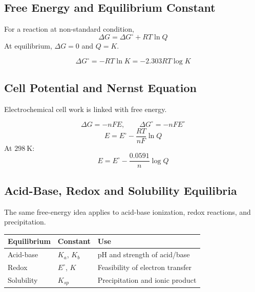 \documentclass[12pt,a4paper]{article}
\begin{document}
\subsection{Free Energy and Equilibrium Constant}
For a reaction at non-standard condition,
\[
\Delta G=\Delta G^\circ+RT\ln Q
\]
At equilibrium, $\Delta G=0$ and $Q=K$.

\begin{tcolorbox}[formulabox, title={Relation Between Free Energy and Equilibrium Constant}]
\[
\Delta G^\circ=-RT\ln K=-2.303RT\log K
\]
\end{tcolorbox}

\subsection{Cell Potential and Nernst Equation}
Electrochemical cell work is linked with free energy.

\begin{tcolorbox}[formulabox, title={Electrochemical Free Energy}]
\[
\Delta G=-nFE,\qquad \Delta G^\circ=-nFE^\circ
\]
\[
E=E^\circ-\frac{RT}{nF}\ln Q
\]
At $298\ \mathrm{K}$:
\[
E=E^\circ-\frac{0.0591}{n}\log Q
\]
\end{tcolorbox}

\begin{tcolorbox}[tikzbox, title={Galvanic Cell and Electron Flow}]
\centering
{}
\end{tcolorbox}

\subsection{Acid-Base, Redox and Solubility Equilibria}
The same free-energy idea applies to acid-base ionization, redox reactions, and precipitation.

\begin{tabularx}{\linewidth}{|B{3.2cm}|Y|Y|}
\hline
\textbf{Equilibrium} & \textbf{Constant} & \textbf{Use} \\
\hline
Acid-base & $K_a$, $K_b$ & pH and strength of acid/base \\
\hline
Redox & $E^\circ$, $K$ & Feasibility of electron transfer \\
\hline
Solubility & $K_{sp}$ & Precipitation and ionic product \\
\hline
\end{tabularx}
\end{document}
